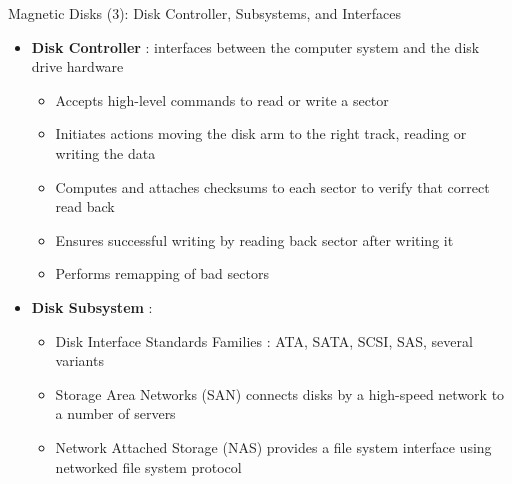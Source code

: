 \documentclass[aspectratio=169, xcolor=dvipsnames]{beamer}
\begin{document}
\begin{frame}{Magnetic Disks (3): Disk Controller, Subsystems, and Interfaces}
    \begin{block}{}
        \begin{itemize}[<+->]
            \item \textbf{Disk Controller} : interfaces between the computer system and the disk drive hardware
            \begin{itemize}[<+->]
                \item Accepts high-level commands to read or write a sector
                \item Initiates actions moving the disk arm to the right track, reading or writing the data
                \item Computes and attaches checksums to each sector to verify that correct read back
                \item Ensures successful writing by reading back sector after writing it
                \item Performs remapping of bad sectors
            \end{itemize}
            \item \textbf{Disk Subsystem} :
            \begin{itemize}[<+->]
                \item Disk Interface Standards Families : ATA, SATA, SCSI, SAS, several variants
                \item Storage Area Networks (SAN) connects disks by a high-speed network to a number of servers
                \item Network Attached Storage (NAS) provides a file system interface using networked file system protocol
            \end{itemize}
        \end{itemize}
    \end{block}
\end{frame}
\end{document}
